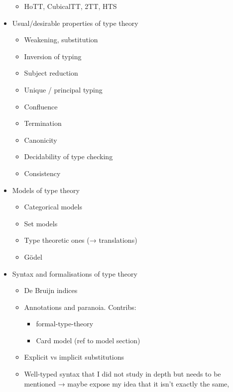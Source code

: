 \begin{itemize}
\begin{itemize}
      \item HoTT, CubicalTT, 2TT, HTS
    \end{itemize}
  \item Usual/desirable properties of type theory
    \begin{itemize}
      \item Weakening, substitution
      \item Inversion of typing
      \item Subject reduction
      \item Unique / principal typing
      \item Confluence
      \item Termination
      \item Canonicity
      \item Decidability of type checking
      \item Consistency
    \end{itemize}
  \item Models of type theory
    \begin{itemize}
      \item Categorical models
      \item Set models
      \item Type theoretic ones (→ translations)
      \item Gödel
    \end{itemize}
  \item Syntax and formalisations of type theory
    \begin{itemize}
      \item De Bruijn indices
      \item Annotations and paranoia. Contribs:
        \begin{itemize}
          \item formal-type-theory
          \item Card model (ref to model section)
        \end{itemize}
      \item Explicit vs implicit substitutions
      \item Well-typed syntax that I did not study in depth but needs to be
      mentioned → maybe expose my idea that it isn't exactly the same,

\end{itemize}
\end{itemize}
